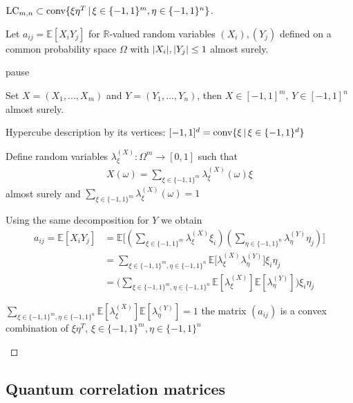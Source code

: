 \begin{frame}
\begin{proof}[$   \textup{LC}_{m,n}  \subset \textup{conv} \{  \xi\eta^T \, | \, \xi \in \{-1,1\}^m, \eta \in \{-1,1\}^n     \} $]
	\begin{itemize}
		{\item Let $ a_{ij} = \mathbb{E}[X_iY_j] $ for $ \mathbb{R} $-valued random variables $ (X_i),(Y_j) $ defined on a common probability space $ \Omega $ with $ {\left|{X_i}\right|},{\left|{Y_j}\right|} \le 1 $ almost surely. }
		pause
		{\item Set $ X= (X_1,...,X_m) $ and $ Y= (Y_1,...,Y_n) $, then $ X \in [-1,1]^m, \, Y \in [-1,1]^n $ almost surely.}
		{\item Hypercube description by its vertices: $ [-1,1]^d = \textup{conv} \{\xi \, | \, \xi \in \{-1,1 \}^d \}$ }
		{\item Define random variables $ \lambda_{\xi}^{(X)}: \Omega^m \to [0,1] $ such that 
			\begin{align*}
			X(\omega) = \sum_{\xi \in \{-1,1\}^m}\lambda_{\xi}^{(X)}(\omega)\xi
			\end{align*} 
			almost surely 
			and $ \sum_{\xi \in \{-1,1\}^m}\lambda_{\xi}^{(X)}(\omega) = 1  $}
		{\item Using the same decomposition for $ Y $ we obtain 
			\begin{align*}
			a_{ij} = \mathbb{E}[X_iY_j] &= \mathbb{E} \big [  (\sum_{\xi \in \{-1,1\}^m}\lambda_{\xi}^{(X)}\xi_i ) (\sum_{\eta \in \{-1,1\}^n}\lambda_{\eta}^{(Y)}\eta_j ) \big ]   \\
			&= \sum_{\xi \in \{-1,1\}^m, \eta \in \{-1,1\}^n} \mathbb{E}\big [\lambda_{\xi}^{(X)}\lambda_{\eta}^{(Y)} \big ] \xi_i \eta_j  \\
			&= \big (\sum_{\xi \in \{-1,1\}^m, \eta \in \{-1,1\}^n}\mathbb{E} [\lambda_{\xi}^{(X)} ]\mathbb{E}[\lambda_{\eta}^{(Y)}]\big )\xi_i\eta_j
			\end{align*}}
		{\item $
			\sum_{\xi \in \{-1,1\}^m, \eta \in \{-1,1\}^n}\mathbb{E} [\lambda_{\xi}^{(X)} ]\mathbb{E}[\lambda_{\eta}^{(Y)}] = 1 $
			the matrix $ (a_{ij}) $ is a convex combination of $ \xi \eta^T $, $ \xi \in \{-1,1\}^m, \eta \in \{-1,1 \}^n $}
	\end{itemize}
\end{proof}
\end{frame}



\subsection{Quantum correlation matrices}

